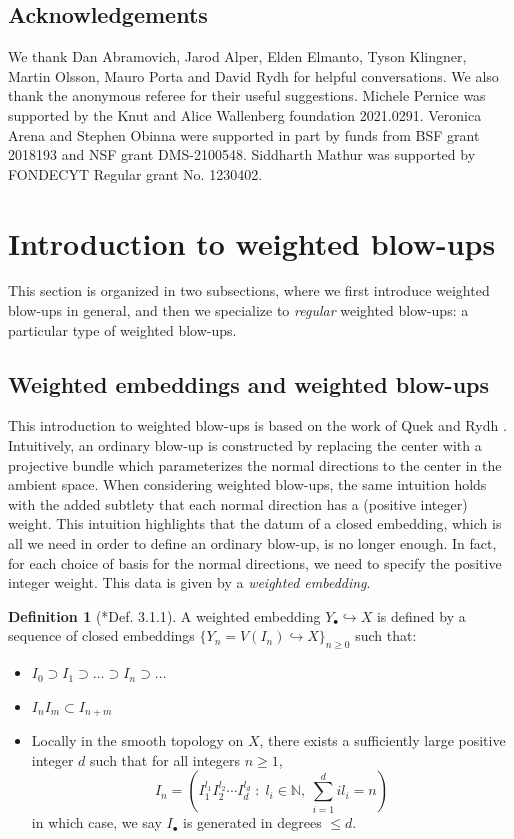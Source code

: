\documentclass{amsart}
\newcommand{\bN}{\mathbb{N}}
\theoremstyle{definition}
\newtheorem{Def}[theorem]{Definition}
\begin{document}
\subsection*{Acknowledgements} We thank Dan Abramovich, Jarod Alper, Elden Elmanto, Tyson Klingner, Martin Olsson, Mauro Porta and David Rydh for helpful conversations. We also thank the anonymous referee for their useful suggestions. Michele Pernice was supported by the Knut and Alice Wallenberg foundation 2021.0291. Veronica Arena and Stephen Obinna were supported in part by funds from BSF grant 2018193 and NSF grant DMS-2100548. Siddharth Mathur was supported
by FONDECYT Regular grant No. 1230402.

  \section{Introduction to weighted blow-ups}\label{section_introduction_to_wblowups}

This section is organized in two subsections, where we first introduce weighted blow-ups in general, and then we specialize to \textit{regular} weighted blow-ups: a particular type of weighted blow-ups.
\subsection{Weighted embeddings and weighted blow-ups}
This introduction to weighted blow-ups is based on the work of Quek and Rydh \cite{QR}.
Intuitively, an ordinary blow-up is constructed by replacing the center with a projective bundle which parameterizes the normal directions to the center in the ambient space. When considering weighted blow-ups, the same intuition holds with the added subtlety that each normal direction has a (positive integer) weight. 
This intuition highlights that the datum of a closed embedding, which is all we need in order to define an ordinary blow-up, is no longer enough. In fact, for each choice of basis for the normal directions, we need to specify the positive integer weight. 
This data is given by a \textit{weighted embedding}. 

\begin{Def}[\cite{QR}*{Def. 3.1.1}]\label{def_weighted_embedding}
    A weighted embedding $Y_{\bullet} \hookrightarrow X$ is defined by a sequence of closed embeddings $\{ Y_n=V(I_n) \hookrightarrow X \}_{n \ge 0}$ such that: \begin{itemize}
        \item $I_0 \supset I_1 \supset \dots \supset I_n \supset \dots$
        \item $I_n I_m \subset I_{n+m}$
        \item Locally in the smooth topology on $X$, there exists a sufficiently large positive integer $d$ such that for all integers $n \ge 1$, $$I_n=\left(I_1^{l_1}I_2^{l_2} \cdots I_d^{l_d} \; : \; l_i \in \bN, \ \sum_{i=1}^d il_i=n\right)$$ in which case, we say $I_\bullet$ is generated in degrees $\le d$. 
    \end{itemize} 
\end{Def} 
\end{document}
